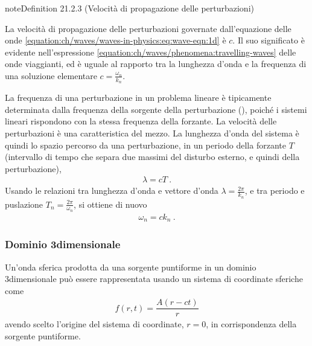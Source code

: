 \documentclass[letterpaper,10pt,italian]{jupyterBook}
\begin{document}
\label{ch/waves/phenomena:wave-speed}
\begin{sphinxadmonition}{note}{Definition 21.2.3 (Velocità di propagazione delle perturbazioni)}



\sphinxAtStartPar
La velocità di propagazione delle perturbazioni governate dall’equazione delle onde \eqref{equation:ch/waves/waves-in-physics:eq:wave-eqn:1d} è \(c\). Il suo significato è evidente nell’espressione \eqref{equation:ch/waves/phenomena:travelling-waves} delle onde viaggianti, ed è uguale al rapporto tra la lunghezza d’onda e la frequenza di una soluzione elementare \(c = \frac{\omega_n}{k_n}\).
\end{sphinxadmonition}

\sphinxAtStartPar
La frequenza di una perturbazione in un problema lineare è tipicamente determinata dalla frequenza della sorgente della perturbazione (), poiché i sistemi lineari rispondono con la stessa frequenza della forzante. La velocità delle perturbazioni è una caratteristica del mezzo. La lunghezza d’onda del sistema è quindi lo spazio percorso da una perturbazione, in un periodo della forzante \(T\) (intervallo di tempo che separa due massimi del disturbo esterno, e quindi della perturbazione),
\begin{equation*}
\begin{split}\lambda = c T \ .\end{split}
\end{equation*}
\sphinxAtStartPar
Usando le relazioni tra lunghezza d’onda e vettore d’onda \(\lambda = \frac{2 \pi}{k_n}\), e tra periodo e puslazione \(T_n = \frac{2 \pi}{\omega_n}\), si ottiene di nuovo
\begin{equation*}
\begin{split}\omega_n = c k_n \ .\end{split}
\end{equation*}

\subsubsection{Dominio 3\sphinxhyphen{}dimensionale}
\label{\detokenize{ch/waves/phenomena:dominio-3-dimensionale}}


\sphinxAtStartPar
{} Un’onda sferica prodotta da una sorgente puntiforme in un dominio 3\sphinxhyphen{}dimensionale può essere rappresentata usando un sistema di coordinate sferiche come
\begin{equation*}
\begin{split}f(r,t) = \dfrac{A(r-ct)}{r}\end{split}
\end{equation*}
\sphinxAtStartPar
avendo scelto l’origine del sistema di coordinate, \(r=0\), in corrispondenza della sorgente puntiforme.
\end{document}

